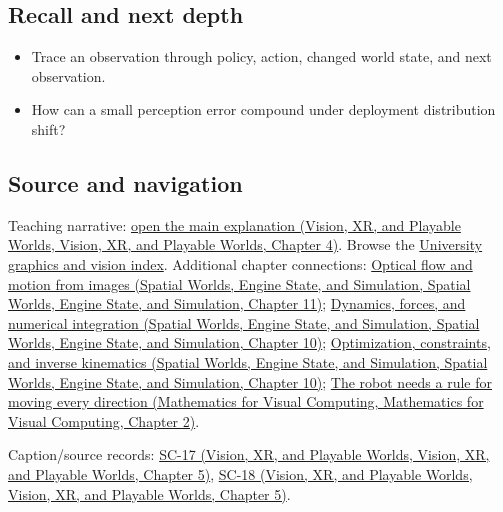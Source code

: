 \subsection{Recall and next depth}\label{appendix-b0c42da325f1-recall-and-next-depth}

\begin{itemize}
\tightlist
\item
  Trace an observation through policy, action, changed world state, and next observation.
\item
  How can a small perception error compound under deployment distribution shift?
\end{itemize}

\subsection{Source and navigation}\label{appendix-b0c42da325f1-source-and-navigation}

Teaching narrative: \href{../07-Vision-XR-and-Playable-Worlds/main.pdf\#nameddest=04-visual-computing-ii-ch034-robot-learning-closes-the-perception-action-loop}{open the main explanation (Vision, XR, and Playable Worlds, Vision, XR, and Playable Worlds, Chapter 4)}. Browse the \hyperref[appendix-a6d556a4ef50-university-graphics-vision-and-photography---independent-series]{University graphics and vision index}. Additional chapter connections: \href{../05-Spatial-Worlds-Engine-State-and-Simulation/main.pdf\#nameddest=04-visual-computing-ii-ch030-optical-flow-and-motion-from-images}{Optical flow and motion from images (Spatial Worlds, Engine State, and Simulation, Spatial Worlds, Engine State, and Simulation, Chapter 11)}; \href{../05-Spatial-Worlds-Engine-State-and-Simulation/main.pdf\#nameddest=04-visual-computing-ii-ch029-dynamics-forces-and-numerical-integration}{Dynamics, forces, and numerical integration (Spatial Worlds, Engine State, and Simulation, Spatial Worlds, Engine State, and Simulation, Chapter 10)}; \href{../05-Spatial-Worlds-Engine-State-and-Simulation/main.pdf\#nameddest=04-visual-computing-ii-ch029-optimization-constraints-and-inverse-kinematics}{Optimization, constraints, and inverse kinematics (Spatial Worlds, Engine State, and Simulation, Spatial Worlds, Engine State, and Simulation, Chapter 10)}; \href{../02-Mathematics-for-Visual-Computing/main.pdf\#nameddest=01-foundations-i-ch018-the-robot-needs-a-rule-for-moving-every-direction}{The robot needs a rule for moving every direction (Mathematics for Visual Computing, Mathematics for Visual Computing, Chapter 2)}.

Caption/source records: \href{../07-Vision-XR-and-Playable-Worlds/main.pdf\#nameddest=04-visual-computing-ii-ch036-sc-17---stanford-cs231n-deep-learning-for-computer-vision-spring-2025-lecture-17-robot-learning}{SC-17 (Vision, XR, and Playable Worlds, Vision, XR, and Playable Worlds, Chapter 5)}, \href{../07-Vision-XR-and-Playable-Worlds/main.pdf\#nameddest=04-visual-computing-ii-ch036-sc-18---stanford-cs231n-deep-learning-for-computer-vision-spring-2025-lecture-18-human-centered-ai}{SC-18 (Vision, XR, and Playable Worlds, Vision, XR, and Playable Worlds, Chapter 5)}.
